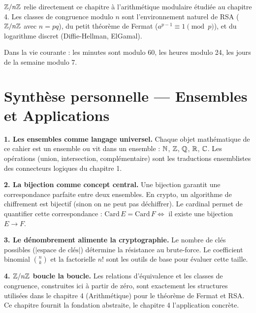 \begin{intuitionbox}
$\mathbb{Z}/n\mathbb{Z}$ relie directement ce chapitre à l'arithmétique modulaire étudiée au chapitre 4. Les classes de congruence modulo $n$ sont l'environnement naturel de RSA ($\mathbb{Z}/n\mathbb{Z}$ avec $n = pq$), du petit théorème de Fermat ($a^{p-1} \equiv 1 \pmod{p}$), et du logarithme discret (Diffie-Hellman, ElGamal).

Dans la vie courante : les minutes sont modulo 60, les heures modulo 24, les jours de la semaine modulo 7.
\end{intuitionbox}


\section{Synthèse personnelle --- Ensembles et Applications}

\begin{intuitionbox}
\textbf{1. Les ensembles comme langage universel.} Chaque objet mathématique de ce cahier est un ensemble ou vit dans un ensemble : $\mathbb{N}$, $\mathbb{Z}$, $\mathbb{Q}$, $\mathbb{R}$, $\mathbb{C}$. Les opérations (union, intersection, complémentaire) sont les traductions ensemblistes des connecteurs logiques du chapitre 1.

\textbf{2. La bijection comme concept central.} Une bijection garantit une correspondance parfaite entre deux ensembles. En crypto, un algorithme de chiffrement est bijectif (sinon on ne peut pas déchiffrer). Le cardinal permet de quantifier cette correspondance : $\mathrm{Card}\, E = \mathrm{Card}\, F \iff$ il existe une bijection $E \to F$.

\textbf{3. Le dénombrement alimente la cryptographie.} Le nombre de clés possibles ($|\text{espace de clés}|$) détermine la résistance au brute-force. Le coefficient binomial $\binom{n}{k}$ et la factorielle $n!$ sont les outils de base pour évaluer cette taille.

\textbf{4. $\mathbb{Z}/n\mathbb{Z}$ boucle la boucle.} Les relations d'équivalence et les classes de congruence, construites ici à partir de zéro, sont exactement les structures utilisées dans le chapitre 4 (Arithmétique) pour le théorème de Fermat et RSA. Ce chapitre fournit la fondation abstraite, le chapitre 4 l'application concrète.
\end{intuitionbox}


